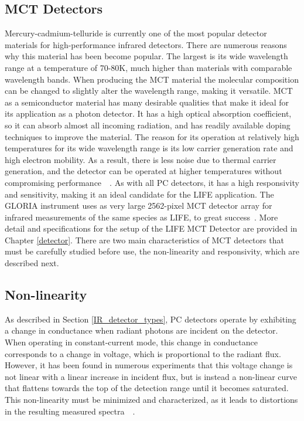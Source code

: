 \subsection{MCT Detectors}\label{MCT_detectors}

Mercury-cadmium-telluride is currently one of the most popular detector materials for high-performance infrared detectors. There are numerous reasons why this material has been become popular. The largest is its wide wavelength range at a temperature of 70-80K, much higher than materials with comparable wavelength bands. When producing the MCT material the molecular composition can be changed to slightly alter the wavelength range, making it versatile. MCT as a semiconductor material has many desirable qualities that make it ideal for its application as a photon detector. It has a high optical absorption coefficient, so it can absorb almost all incoming radiation, and has readily available doping techniques to improve the material. The reason for its operation at relatively high temperatures for its wide wavelength range is its low carrier generation rate and high electron mobility. As a result, there is less noise due to thermal carrier generation, and the detector can be operated at higher temperatures without compromising performance~\citep{mct_detector_text_new}~\citep{mct_detector_text_old}. As with all PC detectors, it has a high responsivity and sensitivity, making it an ideal candidate for the LIFE application. The GLORIA instrument uses as very large 2562-pixel MCT detector array for infrared measurements of the same species as LIFE, to great success~\citep{GLORIA_concept}. More detail and specifications for the setup of the LIFE MCT Detector are provided in Chapter \ref{detector}. There are two main characteristics of MCT detectors that must be carefully studied before use, the non-linearity and responsivity, which are described next.

\subsection{Non-linearity}\label{non-linerity}
As described in Section \ref{IR_detector_types}, PC detectors operate by exhibiting a change in conductance when radiant photons are incident on the detector. When operating in constant-current mode, this change in conductance corresponds to a change in voltage, which is proportional to the radiant flux. However, it has been found in numerous experiments that this voltage change is not linear with a linear increase in incident flux, but is instead a non-linear curve that flattens towards the top of the detection range until it becomes saturated. This non-linearity must be minimized and characterized, as it leads to distortions in the resulting measured spectra~\citep{MCT_linearity}~\citep{ele_inf_IR_signal_nonlinearity}.

